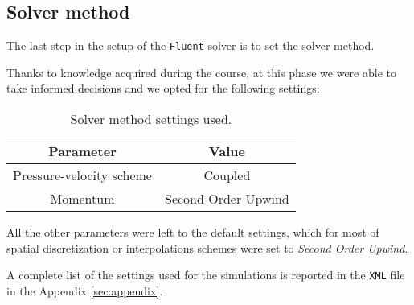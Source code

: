 \subsection{Solver method}
\label{subsubsec:solver_method}

The last step in the setup of the \texttt{Fluent} solver is to set the solver method.

Thanks to knowledge acquired during the course, at this phase we were able to take informed decisions and we opted for the following settings:

\begin{table}[H]
    \centering
    \begin{tabular}{|c|c|}
        \hline
        \textbf{Parameter}       & \textbf{Value}      \\
        \hline
        Pressure-velocity scheme & Coupled             \\
        Momentum                 & Second Order Upwind \\
        \hline
    \end{tabular}
    \caption{Solver method settings used.}
    \label{tab:solver_method}
\end{table}

All the other parameters were left to the default settings, which for most of spatial discretization or interpolations schemes were set to \textit{Second Order Upwind}.

A complete list of the settings used for the simulations is reported in the \texttt{XML} file in the Appendix \ref{sec:appendix}.
